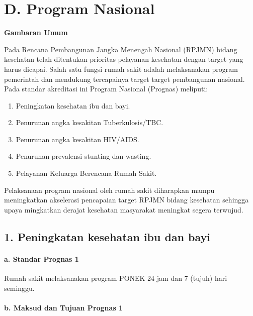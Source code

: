 \documentclass[
]{book}
\providecommand{\tightlist}{%
  \setlength{\itemsep}{0pt}\setlength{\parskip}{0pt}}
\begin{document}
\hypertarget{d.-program-nasional}{%
\chapter*{D. Program Nasional}\label{d.-program-nasional}}

\textbf{Gambaran Umum}

Pada Rencana Pembangunan Jangka Menengah Nasional (RPJMN) bidang kesehatan telah ditentukan prioritas pelayanan kesehatan dengan target yang harus dicapai. Salah satu fungsi rumah sakit adalah melaksanakan program pemerintah dan mendukung tercapainya target target pembangunan nasional. Pada standar akreditasi ini Program Nasional (Prognas) meliputi:

\begin{enumerate}
\def\labelenumi{\arabic{enumi}.}
\tightlist
\item
  Peningkatan kesehatan ibu dan bayi.
\item
  Penurunan angka kesakitan Tuberkulosis/TBC.
\item
  Penurunan angka kesakitan HIV/AIDS.
\item
  Penurunan prevalensi stunting dan wasting.
\item
  Pelayanan Keluarga Berencana Rumah Sakit.
\end{enumerate}

Pelaksanaan program nasional oleh rumah sakit diharapkan mampu meningkatkan akselerasi pencapaian target RPJMN bidang kesehatan sehingga upaya mingkatkan derajat kesehatan masyarakat meningkat segera terwujud.

\hypertarget{peningkatan-kesehatan-ibu-dan-bayi}{%
\section*{1. Peningkatan kesehatan ibu dan bayi}\label{peningkatan-kesehatan-ibu-dan-bayi}}

\hypertarget{a.-standar-prognas-1}{%
\subsubsection*{a. Standar Prognas 1}\label{a.-standar-prognas-1}}

Rumah sakit melaksanakan program PONEK 24 jam dan 7 (tujuh) hari seminggu.

\hypertarget{b.-maksud-dan-tujuan-prognas-1}{%
\subsubsection*{b. Maksud dan Tujuan Prognas 1}\label{b.-maksud-dan-tujuan-prognas-1}}
\end{document}

